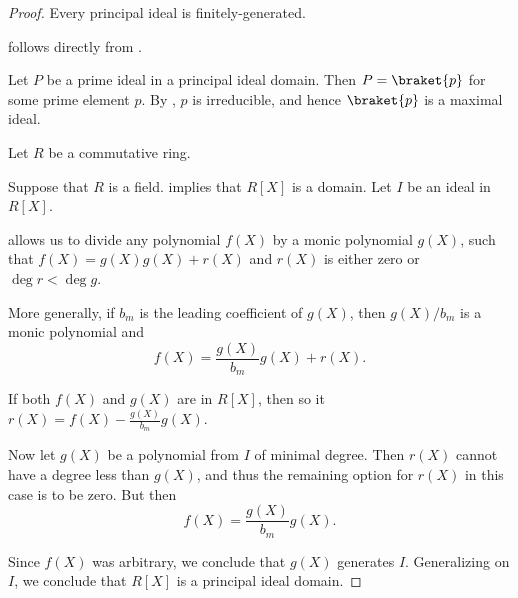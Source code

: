 \begin{proof}
   Every principal ideal is finitely-generated.

    follows directly from .

   Let \( P \) be a prime ideal in a principal ideal domain. Then \( P = \braket{ p } \) for some prime element \( p \). By , \( p \) is irreducible, and hence \( \braket{ p } \) is a maximal ideal.

   Let \( R \) be a commutative ring.

  \SufficiencySubProof* Suppose that \( R \) is a field.  implies that \( R[X] \) is a domain. Let \( I \) be an ideal in \( R[X] \).

   allows us to divide any polynomial \( f(X) \) by a monic polynomial \( g(X) \), such that \( f(X) = g(X) g(X) + r(X) \) and \( r(X) \) is either zero or \( \deg r < \deg g \).

  More generally, if \( b_m \) is the leading coefficient of \( g(X) \), then \( g(X) / b_m \) is a monic polynomial and
  \begin{equation*}
    f(X) = \frac {g(X)} {b_m} g(X) + r(X).
  \end{equation*}

  If both \( f(X) \) and \( g(X) \) are in \( R[X] \), then so it \( r(X) = f(X) - \frac {g(X)} {b_m} g(X) \).

  Now let \( g(X) \) be a polynomial from \( I \) of minimal degree. Then \( r(X) \) cannot have a degree less than \( g(X) \), and thus the remaining option for \( r(X) \) in this case is to be zero. But then
  \begin{equation*}
    f(X) = \frac {g(X)} {b_m} g(X).
  \end{equation*}

  Since \( f(X) \) was arbitrary, we conclude that \( g(X) \) generates \( I \). Generalizing on \( I \), we conclude that \( R[X] \) is a principal ideal domain.


\end{proof}
